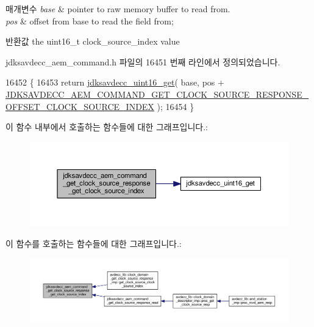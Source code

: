 \begin{DoxyParams}{매개변수}
{\em base} & pointer to raw memory buffer to read from. \\
\hline
{\em pos} & offset from base to read the field from; \\
\hline
\end{DoxyParams}
\begin{DoxyReturn}{반환값}
the uint16\+\_\+t clock\+\_\+source\+\_\+index value 
\end{DoxyReturn}


jdksavdecc\+\_\+aem\+\_\+command.\+h 파일의 16451 번째 라인에서 정의되었습니다.


\begin{DoxyCode}
16452 \{
16453     \textcolor{keywordflow}{return} \hyperlink{group__endian_ga3fbbbc20be954aa61e039872965b0dc9}{jdksavdecc\_uint16\_get}( base, pos + 
      \hyperlink{group__command__get__clock__source__response_ga6e8597483bfa45d6cb7cec7b4d7a0b30}{JDKSAVDECC\_AEM\_COMMAND\_GET\_CLOCK\_SOURCE\_RESPONSE\_OFFSET\_CLOCK\_SOURCE\_INDEX}
       );
16454 \}
\end{DoxyCode}


이 함수 내부에서 호출하는 함수들에 대한 그래프입니다.\+:
\nopagebreak
\begin{figure}[H]
\begin{center}
\leavevmode
\includegraphics[width=350pt]{group__command__get__clock__source__response_gaed5029568cbd203a27a906e689311b16_cgraph}
\end{center}
\end{figure}




이 함수를 호출하는 함수들에 대한 그래프입니다.\+:
\nopagebreak
\begin{figure}[H]
\begin{center}
\leavevmode
\includegraphics[width=350pt]{group__command__get__clock__source__response_gaed5029568cbd203a27a906e689311b16_icgraph}
\end{center}
\end{figure}


